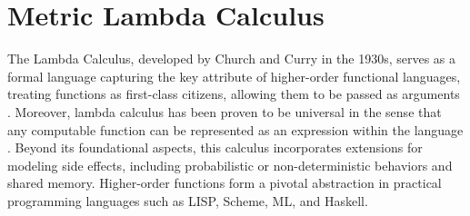 


  


   


















\chapter{Metric Lambda Calculus} \label{ch:metriclambda}


The Lambda Calculus, developed by Church and Curry in the 1930s, serves as a formal language capturing the key attribute of higher-order functional languages, treating functions as first-class citizens, allowing them to be passed as arguments \cite{barendregt1984lambda}.  Moreover, lambda calculus has been proven to be universal in the sense that any computable function can be represented as an expression within the language \cite{bernays1936alonzo} . Beyond its foundational aspects, this calculus incorporates extensions for modeling side effects, including probabilistic or non-deterministic behaviors and shared memory.  Higher-order functions form a pivotal abstraction in practical programming languages such as LISP, Scheme, ML, and Haskell.


